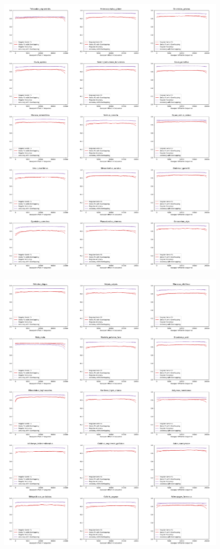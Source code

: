 \documentclass{article}
\begin{document}
\begin{figure}[!h]
\centerline{\includegraphics[width=1.2\textwidth]{images/overlapping/montage_animals6}}
\end{figure}
\begin{figure}[!h]
\centerline{\includegraphics[width=1.2\textwidth]{images/overlapping/montage_animals7}}
\end{figure}
\end{document}
